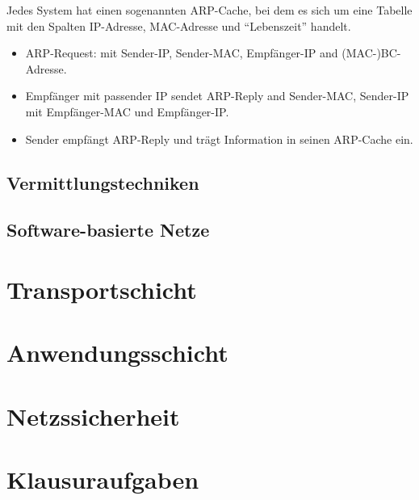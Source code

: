 \documentclass[a4paper, 14pt]{article}
\begin{document}
	Jedes System hat einen sogenannten ARP-Cache, bei dem es sich um eine Tabelle mit den Spalten IP-Adresse, MAC-Adresse und \enquote{Lebenszeit} handelt.

	\begin{itemize}
		\item ARP-Request: mit Sender-IP, Sender-MAC, Empfänger-IP and (MAC-)BC-Adresse.
		\item Empfänger mit passender IP sendet ARP-Reply and Sender-MAC, Sender-IP mit Empfänger-MAC und Empfänger-IP.
		\item Sender empfängt ARP-Reply und trägt Information in seinen ARP-Cache ein.
	\end{itemize}


	\subsection{Vermittlungstechniken}


	\subsection{Software-basierte Netze}


	\section{Transportschicht}

	\section{Anwendungsschicht}

	\section{Netzssicherheit}

	\section{Klausuraufgaben}
\end{document}
